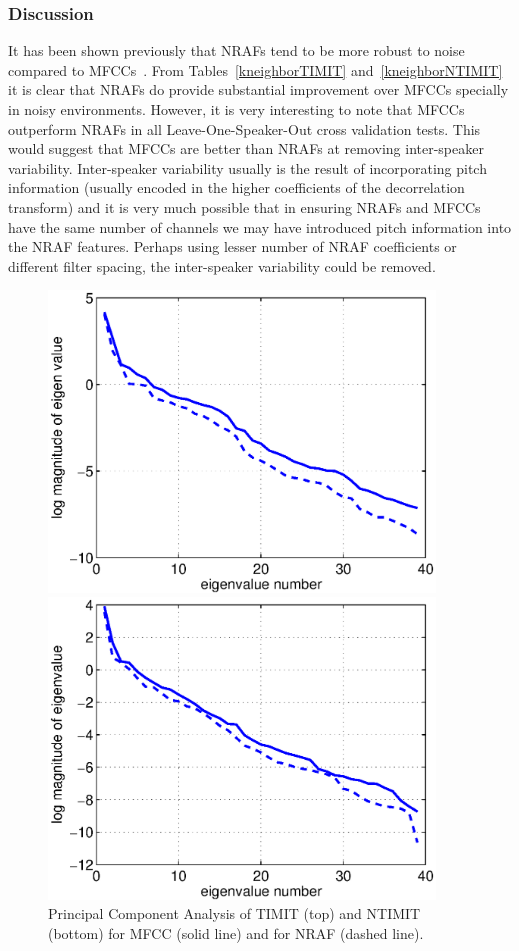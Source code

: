 \documentclass[12pt,letterpaper,doublespaced,ETD,dvips,proposal]{gtthesis}
\begin{document}
\begin{Body}
\subsubsection{Discussion} It has been shown previously that NRAFs
tend to be more robust to noise compared to
MFCCs~\cite{ravindran:inr}. From Tables~\ref{kneighborTIMIT}
and~\ref{kneighborNTIMIT} it is clear that NRAFs do provide
substantial improvement over MFCCs specially in noisy environments.
However, it is very interesting to note that MFCCs outperform NRAFs
in all Leave-One-Speaker-Out cross validation tests. This would
suggest that MFCCs are better than NRAFs at removing inter-speaker
variability. Inter-speaker variability usually is the result of
incorporating pitch information (usually encoded in the higher
coefficients of the decorrelation transform) and it is very much
possible that in ensuring NRAFs and MFCCs have the same number of
channels we may have introduced pitch information into the NRAF
features. Perhaps using lesser number of NRAF coefficients or
different filter spacing, the inter-speaker variability could be
removed.

\begin{figure}[!htb]
\label{pca}
\centerline{\includegraphics[height=8cm]{timit_pca.eps}}
\centerline{\includegraphics[height=8cm]{ntimit_pca.eps}}
\caption{Principal Component Analysis of TIMIT (top) and NTIMIT (bottom) for MFCC (solid line)
and for NRAF (dashed line).}
\end{figure}


\end{Body}
\end{document}

